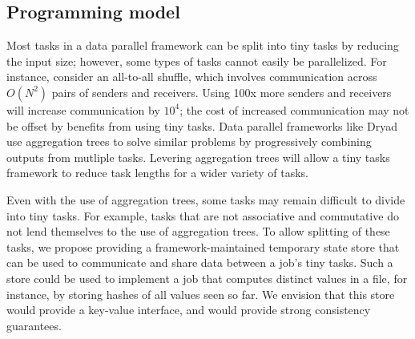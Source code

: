 \subsection{Programming model}
\label{sec:prog}
Most tasks in a data parallel framework can be split into tiny tasks by
reducing the input size; however, some types of tasks cannot easily be
parallelized.
For instance, consider an all-to-all shuffle, which involves
communication across $O(N^2)$ pairs of senders and receivers.
Using 100x more senders and receivers will increase communication by $10^4$;
the cost of increased communication may not be offset by benefits from
using tiny tasks.
Data parallel frameworks like Dryad~\cite{yu2008dryadlinq} use aggregation
trees to solve similar problems by progressively combining outputs from
mutliple tasks. Levering aggregation trees will allow a tiny tasks framework
to reduce task lengths for a wider variety of tasks.

Even with the use of aggregation trees, some tasks may remain difficult to
divide into tiny tasks. For example, tasks that are not associative and
commutative do not lend themselves to the use of aggregation trees.
To allow splitting of these tasks, we propose providing a framework-maintained
temporary state store that can be used to communicate and share data between a
job's tiny tasks. Such a store could be used to implement a job that computes
distinct values in a file, for instance, by storing hashes of all values
seen so far. We envision that this store would provide a key-value interface,
and would provide strong consistency guarantees.


